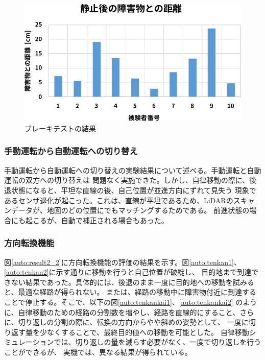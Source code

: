\begin{figure}
  \begin{center}
    \includegraphics[width=.8\linewidth]{img/auto_62.pdf}
    \caption{ブレーキテストの結果}
    \label{auto:result1_3}
  \end{center}
\end{figure}

\subsubsection{手動運転から自動運転への切り替え}
手動運転から自動運転への切り替えの実験結果について述べる。手動運転と自動運転の双方への切り替えは
問題なく実施できた。しかし、自律移動の際に、後退状態になると、平坦な直線の後、自己位置が並進方向にずれて見失う
現象であるセンサ退化が起こった。これは、直線が平坦であるため、LiDARのスキャンデータが、地図のどの位置にでもマッチングするためである。
前進状態の場合にも起こるが、自動で補正される場合もあった。

\subsubsection{方向転換機能}
図\ref{auto:result2_2}に方向転換機能の評価の結果を示す。図\ref{auto:tenkan1}、\ref{auto:tenkan2}に示す通りに移動を行うと自己位置が破綻し、
目的地まで到達できない結果であった。具体的には、後退のまま一度に目的地への移動を試みると、最適な経路が得られない。
または、経路の移動中に障害物付近に到達することで停止する。そこで、以下の図\ref{auto:tenkankai1}、\ref{auto:tenkankai2}
のように、自律移動のための経路の分割数を増やし、経路を直線的にすること、さらに、切り返しの分割の際に、転換の方向からやや斜めの姿勢として、
一度に切り返す量を少なくすることで、最終目的値への移動を可能とした。
自律移動シミュレーションでは、切り返しの量を減らす必要がなく、一度で切り返しを行うことができるが、
実機では、異なる結果が得られている。

